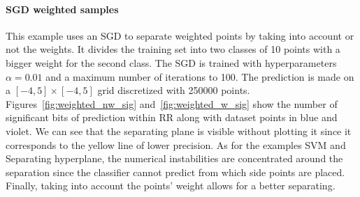 \documentclass[11pt]{article}
\begin{document}



\paragraph{SGD weighted samples}
This example uses an SGD to separate weighted points by taking into account or not the weights. It divides the training set into two classes of 10 points with a bigger weight for the second class. The SGD is trained with hyperparameters $\alpha=0.01$ and a maximum number of iterations to 100. The prediction is made on a $[-4,5]\times[-4,5]$ grid discretized with 250000 points. Figures~\ref{fig:weighted_nw_sig} and~\ref{fig:weighted_w_sig} show the number of significant bits 
of prediction within RR along with dataset points in blue and violet.
We can see that the separating plane is visible without plotting it since it corresponds to the yellow line of lower precision. As for the examples SVM and Separating hyperplane, the numerical instabilities are concentrated around the separation since the classifier cannot predict from which side points are placed. Finally, taking into account the points' weight allows for a better separating.


\end{document}
